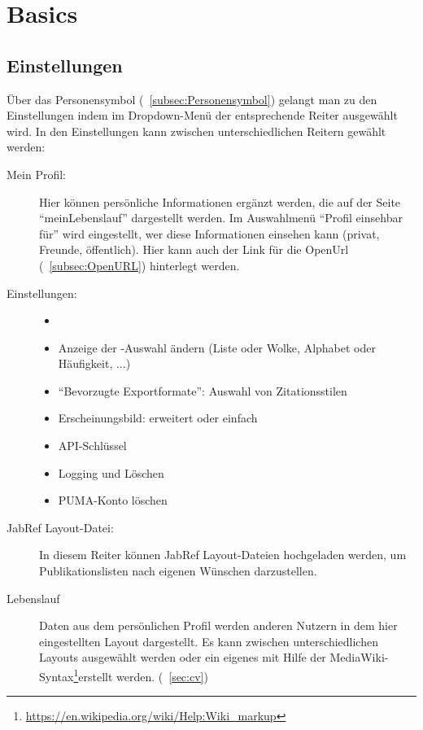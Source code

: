 \chapter{Basics}
\label{ch:basics}
\section{Einstellungen}
\label{sec:einstellungen}
Über das Personensymbol (~\autoref{subsec:Personensymbol}) gelangt man zu den Einstellungen indem im Dropdown-Menü der entsprechende Reiter ausgewählt wird. In den Einstellungen kann zwischen unterschiedlichen Reitern gewählt werden:
\begin{description}
\item[Mein Profil:]
Hier können persönliche Informationen ergänzt werden, die auf der Seite \enquote{meinLebenslauf} dargestellt werden. Im Auswahlmenü \enquote{Profil einsehbar für} wird eingestellt, wer diese Informationen einsehen kann (privat, Freunde, öffentlich). Hier kann auch der Link für die OpenUrl (~\autoref{subsec:OpenURL}) hinterlegt werden. 
\item[Einstellungen:] 
\begin{itemize}
\item[]
\item Anzeige der \tag-Auswahl ändern (Liste oder Wolke, Alphabet oder Häufigkeit, ...)
\item \enquote{Bevorzugte Exportformate}: Auswahl von Zitationsstilen
\item Erscheinungsbild: erweitert oder einfach
\item API-Schlüssel
\item Logging und Löschen 
\item PUMA-Konto löschen
\end{itemize}
\item[JabRef Layout-Datei:] 
In diesem Reiter können JabRef Layout-Dateien hochgeladen werden, um Publikationslisten nach eigenen Wünschen darzustellen.
\item[Lebenslauf]
Daten aus dem persönlichen Profil werden anderen Nutzern in dem hier eingestellten Layout dargestellt. Es kann zwischen unterschiedlichen Layouts ausgewählt werden oder ein eigenes mit Hilfe der MediaWiki-Syntax\footnote{\url{https://en.wikipedia.org/wiki/Help:Wiki_markup}}erstellt werden. (~\autoref{sec:cv})

\end{description}
